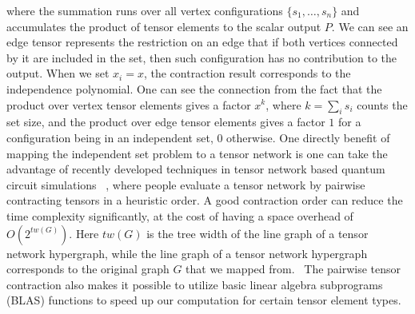 \documentclass[review,onefignum,onetabnum]{siamart190516}
\newcommand{\<}{\langle}
\renewcommand{\>}{\rangle}
\begin{document}
where the summation runs over all vertex configurations $\{s_1,\ldots,s_n\}$ and accumulates the product of tensor elements to the scalar output $P$.
We can see an edge tensor represents the restriction on an edge that if both vertices connected by it are included in the set, then such configuration has no contribution to the output.
When we set $x_i = x$, the contraction result corresponds to the independence polynomial.
One can see the connection from the fact that the product over vertex tensor elements gives a factor $x^k$, where $k=\sum_i s_i$ counts the set size, 
and the product over edge tensor elements gives a factor $1$ for a configuration being in an independent set, $0$ otherwise.
One directly benefit of mapping the independent set problem to a tensor network is one can take the advantage of recently developed techniques in tensor network based quantum circuit simulations ~\cite{Gray2021,Pan2021},
where people evaluate a tensor network by pairwise contracting tensors in a heuristic order.
A good contraction order can reduce the time complexity significantly, at the cost of having a space overhead of $O(2^{tw(G)})$.
Here $tw(G)$ is the tree width of the line graph of a tensor network hypergraph, while the line graph of a tensor network hypergraph corresponds to the original graph $G$ that we mapped from.~\cite{Markov2008}
The pairwise tensor contraction also makes it possible to utilize basic linear algebra subprograms (BLAS) functions to speed up our computation for certain tensor element types.
\end{document}

